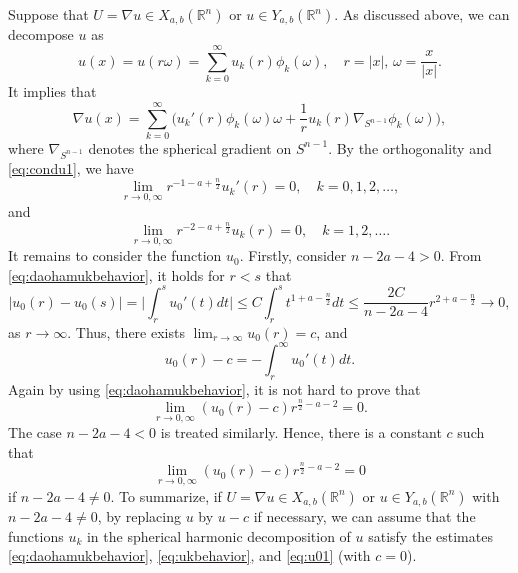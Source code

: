 \documentclass[a4paper,12pt]{article}
\theoremstyle{plain}
\newtheorem{lemma}[theorem]{Lemma}
\theoremstyle{definition}
\theoremstyle{remark}
\def\R{\mathbb R}%
\numberwithin{equation}{section}
\begin{document}
Suppose that $U =\nabla u\in X_{a,b}(\R^n)$ or $u\in Y_{a,b}(\R^n)$. As discussed above, we can decompose $u$ as
\[
u(x) = u(r\omega) = \sum_{k=0}^\infty  u_{k}(r) \phi_{k}(\omega), \quad r = |x|,\, \omega = \frac x{|x|}.
\]
It implies that 
\[
\nabla u (x) = \sum_{k=0}^\infty\Big( u_k'(r) \phi_k(\omega) \omega + \frac1{r} u_k(r) \nabla_{S^{n-1}} \phi_k(\omega)\Big),
\]
where $\nabla_{S^{n-1}}$ denotes the spherical gradient on $S^{n-1}$. By the orthogonality and \eqref{eq:condu1}, we  have 
\begin{equation}\label{eq:daohamukbehavior}
\lim_{r \to 0, \infty} r^{-1-a +\frac n2}u_k'(r) =0,\quad k =0,1,2,\ldots,
\end{equation}
and
\begin{equation}\label{eq:ukbehavior}
\lim_{r \to 0, \infty} r^{-2-a +\frac n2}u_k(r) =0,\quad k =1,2,\ldots.
\end{equation}
It remains to consider the function $u_0$. Firstly, consider  $n -2a -4 >0$. From  \eqref{eq:daohamukbehavior},  it holds for $r< s$ that
\[
|u_0(r) -  u_0(s)| = \Big|\int_r^s u_0'(t) dt\Big| \leq C\int_r^s t^{1 +a -\frac n2} dt \leq \frac{2C}{n -2a -4} r^{2+a -\frac n2} \to 0,
\]
as $r\to \infty$. Thus, there exists $\lim_{r\to \infty} u_0(r) = c$, and
\[
u_0(r) - c = -\int_r^\infty u_0'(t) dt.
\]
Again by using \eqref{eq:daohamukbehavior}, it is not hard to prove that
\[
\lim_{r\to 0, \infty} (u_0(r) - c) r^{\frac n2 -a - 2} =0.
\]
The case $n - 2a -4 < 0$ is treated similarly. Hence,
there is a constant $c$ such that
\begin{equation}\label{eq:u01}
\lim_{r\to 0, \infty} (u_0(r) - c) r^{\frac n2 -a - 2} =0
\end{equation} 
if $n-2a -4 \not =0$. %
To summarize, if $U = \nabla u \in X_{a,b}(\R^n)$ or $u \in Y_{a,b}(\R^n)$ with $n-2a-4\not=0$, by replacing $u$ by $u -c$ if necessary, we can assume that the functions $u_k$ in the spherical harmonic decomposition of $u$ satisfy the estimates \eqref{eq:daohamukbehavior}, \eqref{eq:ukbehavior},  and \eqref{eq:u01} (with $c =0$). %
\end{document}
